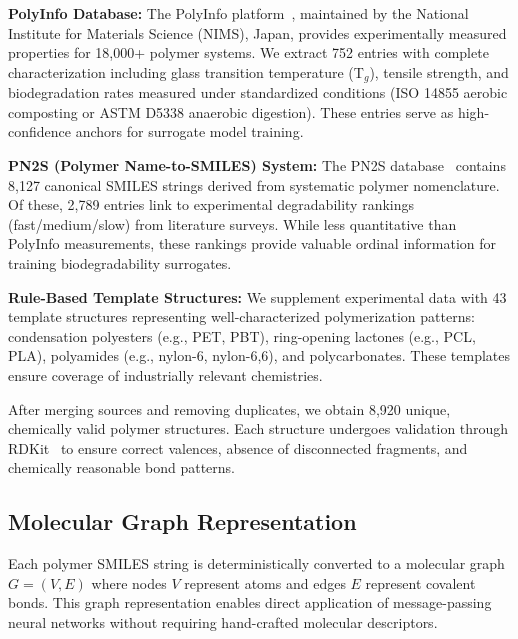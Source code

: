 \documentclass[twocolumn,10pt]{article}
\begin{document}
\textbf{PolyInfo Database:} The PolyInfo platform~\cite{kim2018polymer}, maintained by the National Institute for Materials Science (NIMS), Japan, provides experimentally measured properties for 18,000+ polymer systems. We extract 752 entries with complete characterization including glass transition temperature (T$_g$), tensile strength, and biodegradation rates measured under standardized conditions (ISO 14855 aerobic composting or ASTM D5338 anaerobic digestion). These entries serve as high-confidence anchors for surrogate model training.

\textbf{PN2S (Polymer Name-to-SMILES) System:} The PN2S database~\cite{le2016discovery} contains 8,127 canonical SMILES strings derived from systematic polymer nomenclature. Of these, 2,789 entries link to experimental degradability rankings (fast/medium/slow) from literature surveys. While less quantitative than PolyInfo measurements, these rankings provide valuable ordinal information for training biodegradability surrogates.

\textbf{Rule-Based Template Structures:} We supplement experimental data with 43 template structures representing well-characterized polymerization patterns: condensation polyesters (e.g., PET, PBT), ring-opening lactones (e.g., PCL, PLA), polyamides (e.g., nylon-6, nylon-6,6), and polycarbonates. These templates ensure coverage of industrially relevant chemistries.

After merging sources and removing duplicates, we obtain 8,920 unique, chemically valid polymer structures. Each structure undergoes validation through RDKit~\cite{landrum2023rdkit} to ensure correct valences, absence of disconnected fragments, and chemically reasonable bond patterns.

\subsection{Molecular Graph Representation}

Each polymer SMILES string is deterministically converted to a molecular graph $G = (V, E)$ where nodes $V$ represent atoms and edges $E$ represent covalent bonds. This graph representation enables direct application of message-passing neural networks without requiring hand-crafted molecular descriptors.
\end{document}

